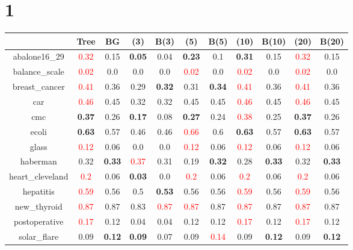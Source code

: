 \documentclass{article}%
\begin{document}
\section*{1}%
\begin{tabular}{c|cccccccccc}%
\hline%
&Tree&BG&(3)&B(3)&(5)&B(5)&(10)&B(10)&(20)&B(20)\\%
\hline%
abalone16\_29&\textcolor{red}{ 
0.32
}&0.15&\textbf{0.05}&0.04&\textbf{0.23}&0.1&\textbf{0.31}&0.15&\textcolor{red}{ 
0.32
}&0.15\\%
\hline%
balance\_scale&\textcolor{red}{ 
0.02
}&0.0&0.0&0.0&\textcolor{red}{ 
0.02
}&0.0&\textcolor{red}{ 
0.02
}&0.0&\textcolor{red}{ 
0.02
}&0.0\\%
\hline%
breast\_cancer&\textcolor{red}{ 
0.41
}&0.36&0.29&\textbf{0.32}&0.31&\textbf{0.34}&\textcolor{red}{ 
0.41
}&0.36&\textcolor{red}{ 
0.41
}&0.36\\%
\hline%
car&\textcolor{red}{ 
0.46
}&0.45&0.32&0.32&0.45&0.45&\textcolor{red}{ 
0.46
}&0.45&\textcolor{red}{ 
0.46
}&0.45\\%
\hline%
cmc&\textbf{0.37}&0.26&\textbf{0.17}&0.08&\textbf{0.27}&0.24&\textcolor{red}{ 
0.38
}&0.25&\textbf{0.37}&0.26\\%
\hline%
ecoli&\textbf{0.63}&0.57&0.46&0.46&\textcolor{red}{ 
0.66
}&0.6&\textbf{0.63}&0.57&\textbf{0.63}&0.57\\%
\hline%
glass&\textcolor{red}{ 
0.12
}&0.06&0.0&0.0&\textcolor{red}{ 
0.12
}&0.06&\textcolor{red}{ 
0.12
}&0.06&\textcolor{red}{ 
0.12
}&0.06\\%
\hline%
haberman&0.32&\textbf{0.33}&\textcolor{red}{ 
0.37
}&0.31&0.19&\textbf{0.32}&0.28&\textbf{0.33}&0.32&\textbf{0.33}\\%
\hline%
heart\_cleveland&\textcolor{red}{ 
0.2
}&0.06&\textbf{0.03}&0.0&\textcolor{red}{ 
0.2
}&0.06&\textcolor{red}{ 
0.2
}&0.06&\textcolor{red}{ 
0.2
}&0.06\\%
\hline%
hepatitis&\textcolor{red}{ 
0.59
}&0.56&0.5&\textbf{0.53}&0.56&0.56&\textcolor{red}{ 
0.59
}&0.56&\textcolor{red}{ 
0.59
}&0.56\\%
\hline%
new\_thyroid&\textcolor{red}{ 
0.87
}&0.87&0.83&\textcolor{red}{ 
0.87
}&\textcolor{red}{ 
0.87
}&0.87&\textcolor{red}{ 
0.87
}&0.87&\textcolor{red}{ 
0.87
}&0.87\\%
\hline%
postoperative&\textcolor{red}{ 
0.17
}&0.12&0.04&0.04&0.12&0.12&\textcolor{red}{ 
0.17
}&0.12&\textcolor{red}{ 
0.17
}&0.12\\%
\hline%
solar\_flare&0.09&\textbf{0.12}&\textbf{0.09}&0.07&0.09&\textcolor{red}{ 
0.14
}&0.09&\textbf{0.12}&0.09&\textbf{0.12}\\%

\end{tabular}
\end{document}
